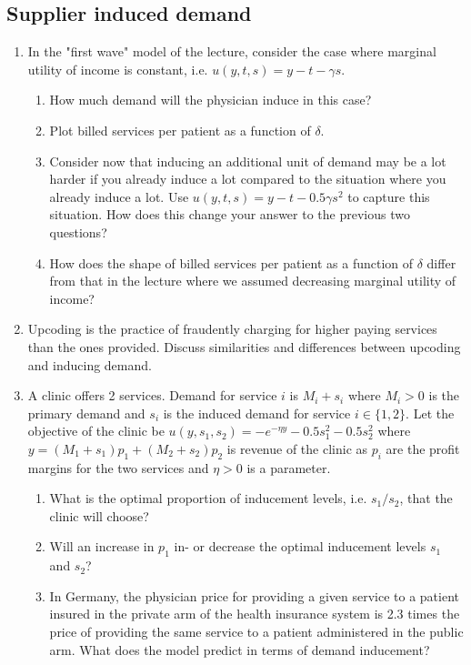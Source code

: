 \documentclass[a4paper]{article}
\begin{document}
\subsection{Supplier induced demand}
\label{sec:org8ca64a8}
\begin{enumerate}[resume]
\item In the "first wave" model of the lecture, consider the case where marginal utility of income is constant, i.e. \(u(y,t,s)=y-t-\gamma s\).
\begin{enumerate}
\item How much demand will the physician induce in this case?
\item Plot billed services per patient as a function of \(\delta\).
\item Consider now that inducing an additional unit of demand may be a lot harder if you already induce a lot compared to the situation where you already induce a lot. Use \(u(y,t,s)=y-t-0.5\gamma s^2\) to capture this situation. How does this change your answer to the previous two questions?
\item How does the shape of billed services per patient as a function of \(\delta\) differ from that in the lecture where we assumed decreasing marginal utility of income?
\end{enumerate}

\item Upcoding is the practice of fraudently charging for higher paying services than the ones provided. Discuss similarities and differences between upcoding and inducing demand.

\item\label{ex:sid2service} A clinic offers 2 services. Demand for service \(i\) is \(M_i+s_i\) where \(M_i>0\) is the primary demand and \(s_i\) is the induced demand for service \(i\in\{1,2\}\). Let the objective of the clinic be \(u(y,s_1,s_2)=-e^{-\eta y}-0.5 s_1^2-0.5 s_2^2\) where \(y=(M_1+s_1)p_1+(M_2+s_2)p_2\) is revenue of the clinic as \(p_i\) are the profit margins for the two services and \(\eta>0\) is a parameter.
\begin{enumerate}
\item What is the optimal proportion of inducement levels, i.e.  \(s_1/s_2\), that the clinic will choose?
\item Will an increase in \(p_1\) in- or decrease the optimal inducement levels \(s_1\) and \(s_2\)?
\item In Germany, the physician price for providing a given service to a patient insured in the private arm of the health insurance system is 2.3 times the price of providing the same service to a patient administered in the public arm. What does the model predict in terms of demand inducement?
\end{enumerate}


\end{enumerate}
\end{document}

